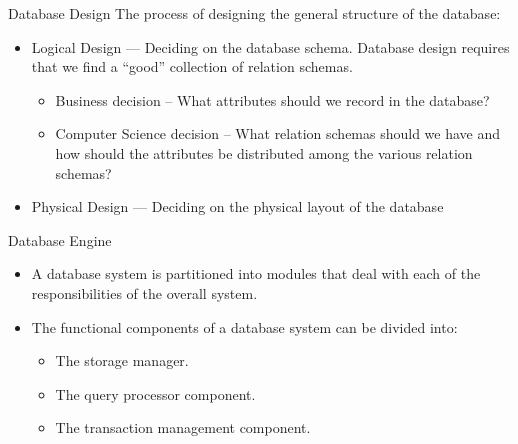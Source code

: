 \documentclass{beamer}
\begin{document}
\begin{frame}{Database Design}
The process of designing the general structure of the database:
    \begin{itemize}
        \item Logical Design --- Deciding on the database schema. Database design requires that we find a “good” collection of relation schemas.
        \begin{itemize}
            \item Business decision -- What attributes should we record in the database?
            \item Computer Science decision --  What relation schemas should we have and how should the attributes be distributed among the various relation schemas?
        \end{itemize}
        \item Physical Design --- Deciding on the physical layout of the database                
    \end{itemize}
\end{frame}

\begin{frame}{Database Engine}
    \begin{itemize}
        \item A database system is partitioned into modules that deal with each of the responsibilities of the overall system.  
        \item The functional components of a database system can be divided into:
        \begin{itemize}
            \item The storage manager.
            \item The  query processor component.
            \item The transaction management component.
        \end{itemize}
    \end{itemize}
\end{frame}
\end{document}
